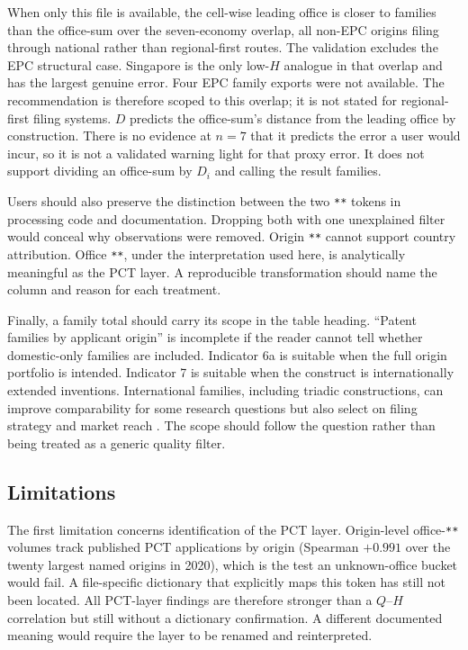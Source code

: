 \documentclass[a4paper,fleqn]{cas-dc}
\begin{document}
When only this file is available, the cell-wise leading office is closer to
families than the office-sum over the seven-economy overlap, all non-EPC
origins filing through national rather than regional-first routes. The
validation excludes the EPC structural case. Singapore is the only low-$H$
analogue in that overlap and has the largest genuine error. Four EPC family
exports were not available. The recommendation is therefore scoped to this
overlap; it is not stated for regional-first filing systems. $D$ predicts the
office-sum's distance from the leading office by construction. There is no
evidence at $n=7$ that it predicts the error a user would incur, so it is not
a validated warning light for that proxy error. It does not support dividing
an office-sum by $D_i$ and calling the result families.

Users should also preserve the distinction between the two \texttt{**}
tokens in processing code and documentation. Dropping both with one
unexplained filter would conceal why observations were removed. Origin
\texttt{**} cannot support country attribution. Office \texttt{**}, under
the interpretation used here, is analytically meaningful as the PCT layer.
A reproducible transformation should name the column and reason for each
treatment.

Finally, a family total should carry its scope in the table heading. ``Patent
families by applicant origin'' is incomplete if the reader cannot tell whether
domestic-only families are included. Indicator 6a is suitable when the full
origin portfolio is intended. Indicator 7 is suitable when the construct is
internationally extended inventions. International families, including
triadic constructions, can improve comparability for some research questions
but also select on filing strategy and market reach
\citep{dernis2004triadic,dechezlepretre2017families}. The scope should follow
the question rather than being treated as a generic quality filter.

\subsection{Limitations}\label{sec:limitations}

The first limitation concerns identification of the PCT layer. Origin-level
office-\texttt{**} volumes track published PCT applications by origin
(Spearman $+0.991$ over the twenty largest named origins in 2020), which is
the test an unknown-office bucket would fail. A file-specific dictionary that
explicitly maps this token has still not been located. All PCT-layer findings
are therefore stronger than a $Q$--$H$ correlation but still without a
dictionary confirmation. A different documented meaning would require the
layer to be renamed and reinterpreted.
\end{document}
